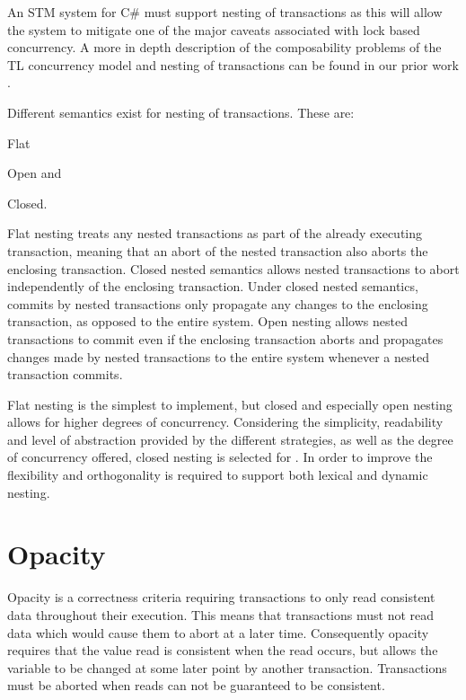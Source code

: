 An \ac{STM} system for C\# must support nesting of transactions as this will allow the system to mitigate one of the major caveats associated with lock based concurrency. A more in depth description of the composability problems of the \ac{TL} concurrency model and nesting of transactions can be found in our prior work \cite{dpt907e14trending}.

Different semantics exist for nesting of transactions. These are:  \begin{inparaenum}
\item Flat
\item Open and 
\item Closed\cite[p. 1]{kumar2011hparstm}\cite[p. 42]{harris2010transactional}.
\end{inparaenum}
Flat nesting treats any nested transactions as part of the already executing transaction, meaning that an abort of the nested transaction also aborts the enclosing transaction. Closed nested semantics allows nested transactions to abort independently of the enclosing transaction. Under closed nested semantics, commits by nested transactions only propagate any changes to the enclosing transaction, as opposed to the entire system. Open nesting allows nested transactions to commit even if the enclosing transaction aborts and propagates changes made by nested transactions to the entire system whenever a nested transaction commits.

Flat nesting is the simplest to implement, but closed and especially open nesting allows for higher degrees of concurrency\cite[p. 43]{harris2010transactional}. Considering the simplicity, readability and level of abstraction provided by the different strategies, as well as the degree of concurrency offered, closed nesting is selected for \stmnamesp. In order to improve the flexibility and orthogonality \stmnamesp is required to support both lexical and dynamic nesting.

\section{Opacity}
\label{sec:stm_req_opacity}
Opacity is a correctness criteria requiring transactions to only read consistent data throughout their execution\cite[p. 1]{guerraoui2007opacity}\cite[p. 29]{harris2010transactional}. This means that transactions must not read data which would cause them to abort at a later time. Consequently opacity requires that the value read is consistent when the read occurs, but allows the variable to be changed at some later point by another transaction. Transactions must be aborted when reads can not be guaranteed to be consistent.

